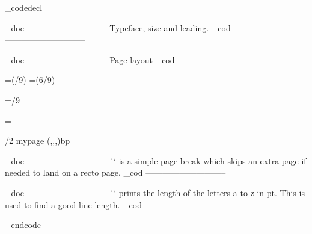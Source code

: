 \_codedecl 

    \_doc -----------------------------
    Typeface, size and leading.
    \_cod -----------------------------

\fontfam[ebgaramond]
\typosize[11/14]

    \_doc -----------------------------
    Page layout
    \_cod -----------------------------



\newdimen\pagewidth     \pagewidth=6in
\newdimen\spinemargin   \spinemargin=\dimexpr(\pagewidth/9)\relax
\newdimen\measure       \measure=\dimexpr(6\pagewidth/9)

\newdimen\pageheight    \pageheight=9in 
\newdimen\depth         \depth=6in     
\newdimen\topmargin     \topmargin=/9\relax
                        \baselineskip
                        \baselineskip

%

\hsize=\measure
\vsize=6in%

\margins/2 mypage (\bp\spinemargin,,\bp\topmargin,)bp



    \_doc -----------------------------
    \`\skiptorecto` is a simple page break which skips an extra page
    if needed to land on a recto page.
    \_cod -----------------------------

\def\skiptorecto{%
    \vfil\break
    \ifodd\pageno\else\vfil\break\fi
}

    \_doc -----------------------------
    \`\alphabetlength` prints the length of the letters a to z in pt.
    This is used to find a good line length.
    \_cod -----------------------------

\def\alphabetlength{%
    \setbox0=\hbox{abcdefghijklmnopqrstuvwxyz}%
    \the\wd0
}

\_endcode
